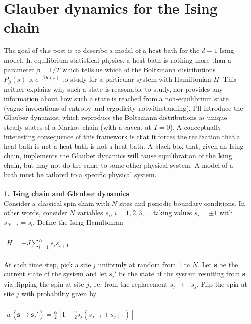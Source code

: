 \documentclass[]{article}
\begin{document}
\section*{Glauber dynamics for the Ising chain}
The goal of this post is to describe a model of a heat bath for the $d=1$ Ising model. In equilibrium statistical physics, a heat bath is nothing more than a parameter $\beta=1/T$ which tells us which of the Boltzmann distributions $P_\beta(s)\propto e^{-\beta H(s)}$ to study for a particular system with Hamiltonian $H$. This neither explains why such a state is reasonable to study, nor provides any information about how such a state is reached from a non-equilibrium state (vague invocations of entropy and ergodicity notwithstanding). I'll introduce the Glauber dynamics, which reproduce the Boltzmann distributions as unique steady states of a Markov chain (with a caveat at $T=0$). A conceptually interesting consequence of this framework is that it forces the realization that a heat bath is not a heat bath is not a heat bath. A black box that, given an Ising chain, implements the Glauber dynamics will cause equilibration of the Ising chain, but may not do the same to some other physical system. A model of a bath must be tailored to a specific physical system.\\
\\
\textbf{1. Ising chain and Glauber dynamics}
\\
Consider a classical spin chain with $N$ sites and periodic boundary conditions. In other words, consider $N$ variables $s_i$, $i=1,2,3,\ldots$ taking values $s_i=\pm 1$ with $s_{N+i}=s_i$. Define the Ising Hamiltonian\\
\\
$\begin{aligned}
H=-J\sum_{i=1}^{N}s_is_{i+1}.
\end{aligned}$\\
\\
At each time step, pick a site $j$ uniformly at random from $1$ to $N$. Let $\mathbf{s}$ be the current state of the system and let $\mathbf{s}_j'$ be the state of the system resulting from $\mathbf{s}$ via flipping the spin at site $j$, i.e. from the replacement $s_j\rightarrow -s_j$. Flip the spin at site $j$ with probability given by\\
\\
$\begin{aligned}
w(\mathbf{s}\rightarrow\mathbf{s}_j')=\frac{\alpha}{2}\left[1-\frac{\gamma}{2}s_j(s_{j-1}+s_{j+1})\right]
\end{aligned}$\\
\end{document}
